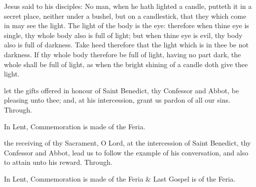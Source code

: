  Jesus said to his disciples: No man, when he hath lighted a candle, putteth it in a secret place, neither under a bushel, but on a candlestick, that they which come in may see the light. The light of the body is the eye: therefore when thine eye is single, thy whole body also is full of light; but when thine eye is evil, thy body also is full of darkness. Take heed therefore that the light which is in thee be not darkness. If thy whole body therefore be full of light, having no part dark, the whole shall be full of light, as when the bright shining of a candle doth give thee light.


\clearpage
\secret
{} let the gifts offered in honour of Saint Benedict, thy Confessor and Abbot, be pleasing unto thee; and, at his intercession, grant us pardon of all our sins. Through.
\begin{rubric}
    In Lent, Commemoration is made of the Feria.
\end{rubric}


\postcommunion
{} the receiving of thy Sacrament, O Lord, at the intercession of Saint Benedict, thy Confessor and Abbot, lead us to follow the example of his conversation, and also to attain unto his reward. Through.
\begin{rubric}
    In Lent, Commemoration is made of the Feria \& Last Gospel is of the Feria.
\end{rubric}




